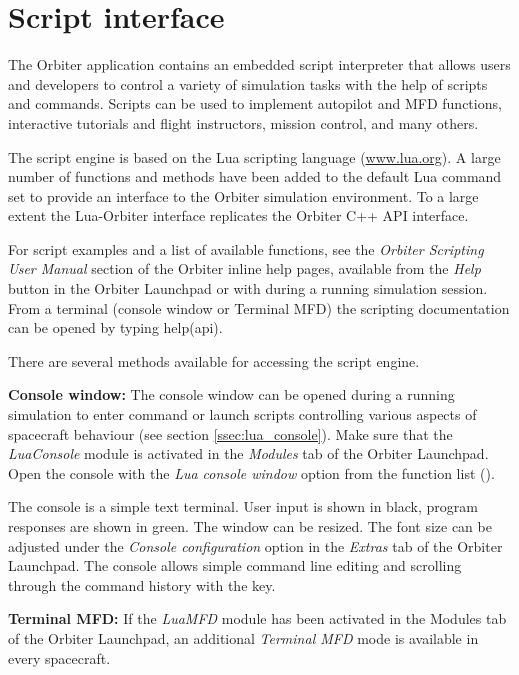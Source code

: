 \documentclass[Orbiter User Manual.tex]{subfiles}
\begin{document}
\section{Script interface}
\label{sec:script}
The Orbiter application contains an embedded script interpreter that allows
users and developers to control a variety of simulation tasks with the help of
scripts and commands. Scripts can be used to implement autopilot and MFD
functions, interactive tutorials and flight instructors, mission control, and
many others.

The script engine is based on the Lua scripting language (\url{www.lua.org}). A
large number of functions and methods have been added to the default Lua command
set to provide an interface to the Orbiter simulation environment. To a large
extent the Lua-Orbiter interface replicates the Orbiter C++ API interface.

For script examples and a list of available functions, see the
\emph{Orbiter Scripting User Manual} section of the Orbiter inline help pages,
available from the \emph{Help} button in the Orbiter Launchpad or with
 during a running simulation session. From a terminal (console
window or Terminal MFD) the scripting documentation can be opened by typing
help(api).

There are several methods available for accessing the script engine.

\textbf{Console window:}
The console window can be opened during a running simulation to enter command or
launch scripts controlling various aspects of spacecraft behaviour (see section
\ref{ssec:lua_console}). Make sure that the \emph{LuaConsole} module is
activated in the \emph{Modules} tab of the Orbiter Launchpad. Open the console
with the \emph{Lua console window} option from the function list
().

The console is a simple text terminal. User input is shown in black, program
responses are shown in green. The window can be resized. The font size can be
adjusted under the \emph{Console configuration} option in the \emph{Extras} tab
of the Orbiter Launchpad. The console allows simple command line editing and
scrolling through the command history with the \UArrow{} key.

\textbf{Terminal MFD:}
If the \emph{LuaMFD} module has been activated in the Modules tab of the Orbiter
Launchpad, an additional \emph{Terminal MFD} mode is available in every
spacecraft.
\end{document}
